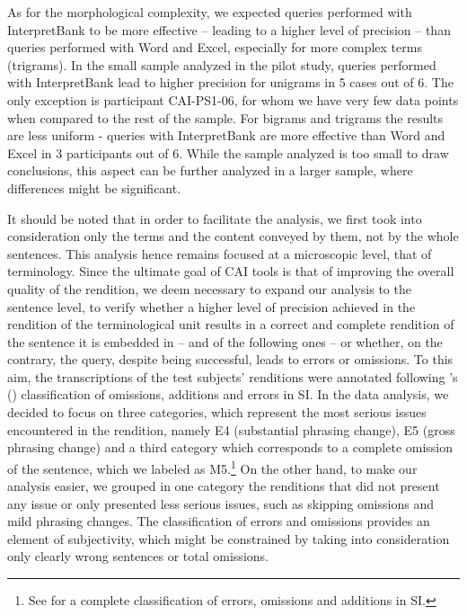 \documentclass[output=paper]{langsci/langscibook}
\begin{document}
As for the morphological complexity, we expected queries performed with InterpretBank to be more effective – leading to a higher level of precision – than queries performed with Word and Excel, especially for more complex terms (trigrams). In the small sample analyzed in the pilot study, queries performed with InterpretBank lead to higher precision for unigrams in 5 cases out of 6. The only exception is participant \textsc{CAI}-PS1-06, for whom we have very few data points when compared to the rest of the sample. For bigrams and trigrams the results are less uniform - queries with InterpretBank are more effective than Word and Excel in 3 participants out of 6. While the sample analyzed is too small to draw conclusions, this aspect can be further analyzed in a larger sample, where differences might be significant.

It should be noted that in order to facilitate the analysis, we first took into consideration only the terms and the content conveyed by them, not by the whole sentences. This analysis hence remains focused at a microscopic level, that of terminology. Since the ultimate goal of \textsc{CAI} tools is that of improving the overall quality of the rendition, we deem necessary to expand our analysis to the sentence level, to verify whether a higher level of precision achieved in the rendition of the terminological unit results in a correct and complete rendition of the sentence it is embedded in – and of the following ones – or whether, on the contrary, the query, despite being successful, leads to errors or omissions. To this aim, the transcriptions of the test subjects’ renditions were annotated following \citeauthor{Barik1971}’s (\citeyear{Barik1971}) classification of omissions, additions and errors in \textsc{SI}. In the data analysis, we decided to focus on three categories, which represent the most serious issues encountered in the rendition, namely E4 (substantial phrasing change), E5 (gross phrasing change) and a third category which corresponds to a complete omission of the sentence, which we labeled as M5.\footnote{See \citet{Barik1971} for a complete classification of errors, omissions and additions in \textsc{SI}.}  On the other hand, to make our analysis easier, we grouped in one category the renditions that did not present any issue or only presented less serious issues, such as skipping omissions and mild phrasing changes. The classification of errors and omissions provides an element of subjectivity, which might be constrained by taking into consideration only clearly wrong sentences or total omissions.
\end{document}

